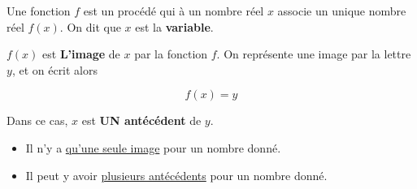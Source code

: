 \documentclass{automatisme}
\begin{document}
\begin{frame}
	Une fonction $f$ est un procédé qui à un nombre réel $x$ associe un unique nombre réel $f(x)$. On dit que $x$ est la \textbf{variable}.

	\begin{center}
	\end{center}
\end{frame}

\begin{frame}
	$f(x)$ est \textbf{L'image} de $x$ par la fonction $f$. On représente une image par la lettre $y$, et on écrit alors

	$$ f(x) = y $$

	Dans ce cas, $x$ est \textbf{UN antécédent} de $y$.

	\begin{tcolorbox}
		\begin{itemize}
			\item Il n'y a \uline{qu'une seule image} pour un nombre donné.
			\item Il peut y avoir \uline{plusieurs antécédents} pour un nombre donné.
		\end{itemize}
	\end{tcolorbox}
\end{frame}

\begin{frame}
\end{frame}
\end{document}
